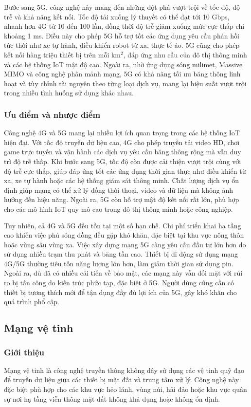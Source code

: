 Bước sang 5G, công nghệ này mang đến những đột phá vượt trội về tốc độ, độ trễ và khả năng kết nối. Tốc độ tải xuống lý thuyết có thể đạt tới 10 Gbps, nhanh hơn 4G từ 10 đến 100 lần, đồng thời độ trễ giảm xuống mức cực thấp chỉ khoảng 1 ms. Điều này cho phép 5G hỗ trợ tốt các ứng dụng yêu cầu phản hồi tức thời như xe tự hành, điều khiển robot từ xa, thực tế ảo. 5G cũng cho phép kết nối hàng triệu thiết bị trên mỗi km$^2$, đáp ứng nhu cầu của đô thị thông minh và các hệ thống IoT mật độ cao. Ngoài ra, nhờ ứng dụng sóng milimet, Massive MIMO và công nghệ phân mảnh mạng, 5G có khả năng tối ưu băng thông linh hoạt và tùy chỉnh tài nguyên theo từng loại dịch vụ, mang lại hiệu suất vượt trội trong nhiều tình huống sử dụng khác nhau.

\subsubsection{Ưu điểm và nhược điểm}
Công nghệ 4G và 5G mang lại nhiều lợi ích quan trọng trong các hệ thống IoT hiện đại. Với tốc độ truyền dữ liệu cao, 4G cho phép truyền tải video HD, chơi game trực tuyến và vận hành các dịch vụ yêu cầu băng thông rộng mà vẫn duy trì độ trễ thấp. Khi bước sang 5G, tốc độ còn được cải thiện vượt trội cùng với độ trễ cực thấp, giúp đáp ứng tốt các ứng dụng thời gian thực như điều khiển từ xa, xe tự hành hoặc các hệ thống giám sát thông minh. Chất lượng dịch vụ ổn định giúp mạng có thể xử lý đồng thời thoại, video và dữ liệu mà không ảnh hưởng đến hiệu năng. Ngoài ra, 5G còn hỗ trợ mật độ kết nối rất lớn, phù hợp cho các mô hình IoT quy mô cao trong đô thị thông minh hoặc công nghiệp.

Tuy nhiên, cả 4G và 5G đều tồn tại một số hạn chế. Chi phí triển khai hạ tầng cao khiến việc phủ sóng đồng đều gặp khó khăn, đặc biệt tại khu vực nông thôn hoặc vùng sâu vùng xa. Việc xây dựng mạng 5G càng yêu cầu đầu tư lớn hơn do sử dụng nhiều trạm thu phát và băng tần cao. Thiết bị di động sử dụng mạng 4G/5G thường tiêu tốn năng lượng lớn hơn, làm giảm thời gian sử dụng pin. Ngoài ra, dù đã có nhiều cải tiến về bảo mật, các mạng này vẫn đối mặt với rủi ro bị tấn công do kiến trúc phức tạp, đặc biệt ở 5G. Người dùng cũng cần có thiết bị tương thích mới để tận dụng đầy đủ lợi ích của 5G, gây khó khăn cho quá trình phổ cập.

\subsection{Mạng vệ tinh}
\subsubsection{Giới thiệu}
Mạng vệ tinh là công nghệ truyền thông không dây sử dụng các vệ tinh quỹ đạo để
truyền dữ liệu giữa các thiết bị mặt đất và trung tâm xử lý. Công nghệ này đặc biệt
phù hợp cho các khu vực hẻo lánh, vùng núi, hải đảo hoặc khu vực quân sự nơi hạ tầng
viễn thông mặt đất không khả dụng hoặc không ổn định.

